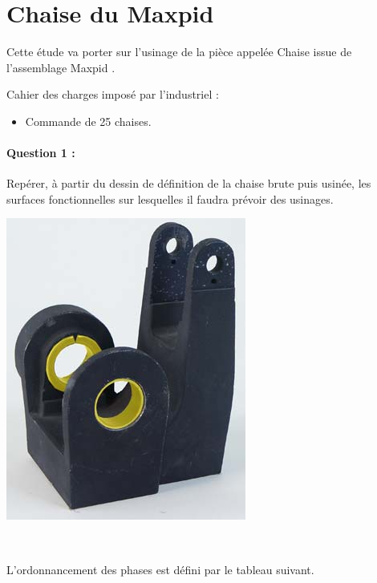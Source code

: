 

\section{Chaise du Maxpid}

\begin{minipage}{0.6\linewidth}
Cette étude va porter sur l'usinage de la pièce appelée \og Chaise \fg issue de l'assemblage \og Maxpid \fg.

Cahier des charges imposé par l'industriel :
\begin{itemize}
 \item Commande de 25 chaises.
\end{itemize}

\paragraph{Question 1 :} Repérer, à partir du dessin de définition de la chaise brute puis usinée, les surfaces fonctionnelles sur lesquelles il faudra prévoir des usinages.

\end{minipage}
\hfill
\begin{minipage}{0.38\linewidth}
 \centering\includegraphics[width=0.6\linewidth]{img/Chaise.jpg}
\end{minipage}

~\

L'ordonnancement des phases est défini par le tableau suivant.

\tiny


